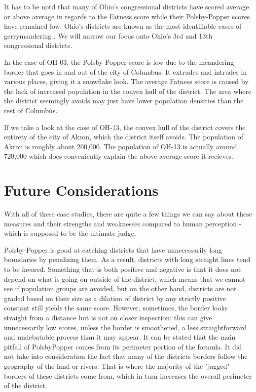 \documentclass[letterpaper]{article}
\begin{document}

It has to be notd that many of Ohio's congressional districts have scored average or above average in regards to the Fatness score while their Polsby-Popper scores have remained low. Ohio's districts are known as the most identifiable cases of gerrymandering \cite{ohiog}. We will narrow our focus onto Ohio's 3rd and 13th congressional districts.

In the case of OH-03, the Polsby-Popper score is low due to the meandering border that goes in and out of the city of Columbus. It extrudes and intrudes in various places, giving it a snowflake look. The average Fatness score is caused by the lack of increased population in the convex hull of the district. The area where the district seemingly avoids may just have lower population densities than the rest of Columbus.

If we take a look at the case of OH-13, the convex hull of the district covers the entirety of the city of Akron, which the district itself avoids. The population of Akron is roughly about 200,000. The population of OH-13 is actually around 720,000 which does conveniently explain the above average score it recieves.

\section{Future Considerations}
With all of these case studies, there are quite a few things we can say about these measures and their strengths and weaknesses compared to human perception - which is supposed to be the ultimate judge.

Polsby-Popper is good at catching districts that have unnecessarily long boundaries by penalizing them. As a result, districts with long straight lines tend to be favored. Something that is both positive and negative is that it does not depend on what is going on outside of the district, which means that we cannot see if population groups are avoided, but on the other hand, districts are not graded based on their size as a dilation of district by any strictly positive constant still yields the same score. However, sometimes, the border looks straight from a distance but is not on closer inspection: this can give unnecessarily low scores, unless the border is smoothened, a less straightforward and undebatable process than it may appear. It can be stated that the main pitfall of PolsbyPopper comes from its perimeter portion of the formula. It did not take into consideration the fact that many of the districts borders follow the geography of the land or rivers. That is where the majority of the "jagged" borders of these districts come from, which in turn increases the overall perimeter of the district.
\end{document}
